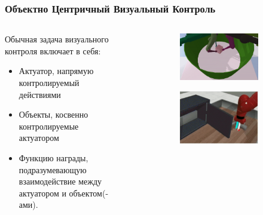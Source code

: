 \begin{frame}
\frametitle{Объектно Центричный Визуальный Контроль}

\begin{columns}[t]
\begin{column}{0.43\linewidth}
    Обычная задача визуального контроля включает в себя:
    \begin{itemize}
        \item Актуатор, напрямую контролируемый действиями
        \item Объекты, косвенно контролируемые актуатором
        \item Функцию награды, подразумевающую взаимодействие между актуатором и объектом(-ами).
    \end{itemize}
\end{column}

\begin{column}{0.55\linewidth}
    \begin{figure}
    \centering
    \begin{subfigure}[c]{.45\linewidth}
        \includegraphics[width=\linewidth]{images/visual_control_envs/causal_world.png}
    \end{subfigure}
    \hspace{1em}
    \begin{subfigure}[c]{.45\linewidth}
        \includegraphics[width=\linewidth]{images/visual_control_envs/metaworld.png}
    \end{subfigure}
    \vspace{3em}
    

\end{figure}
\end{column}
\end{columns}
\end{frame}
